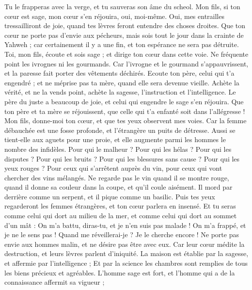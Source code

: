 \begin{multicols}{2}
Tu le frapperas avec la verge, et tu sauveras son âme du scheol.
Mon fils, si ton cœur est sage, mon cœur s'en réjouira, oui, moi-même.
Oui, mes entrailles tressailliront de joie, quand tes lèvres feront entendre des choses droites.
Que ton cœur ne porte pas d'envie aux pécheurs, mais sois tout le jour dans la crainte de Yahweh ;
car certainement il y a une fin, et ton espérance ne sera pas détruite.
Toi, mon fils, écoute et sois sage ; et dirige ton cœur dans cette voie.
Ne fréquente point les ivrognes ni les gourmands.
Car l'ivrogne et le gourmand s'appauvrissent, et la paresse fait porter des vêtements déchirés.
Ecoute ton père, celui qui t'a engendré ; et ne méprise pas ta mère, quand elle sera devenue vieille.
Achète la vérité, et ne la vends point, achète la sagesse, l'instruction et l'intelligence.
Le père du juste a beaucoup de joie, et celui qui engendre le sage s'en réjouira.
Que ton père et ta mère se réjouissent, que celle qui t'a enfanté soit dans l'allégresse !
Mon fils, donne-moi ton cœur, et que tes yeux observent mes voies.
Car la femme débauchée est une fosse profonde, et l'étrangère un puits de détresse.
Aussi se tient-elle aux aguets pour une proie, et elle augmente parmi les hommes le nombre des infidèles.
Pour qui le malheur ? Pour qui les hélas ? Pour qui les disputes ? Pour qui les bruits ? Pour qui les blessures sans cause ? Pour qui les yeux rouges ?
Pour ceux qui s'arrêtent auprès du vin, pour ceux qui vont chercher des vins mélangés.
Ne regarde pas le vin quand il se montre rouge, quand il donne sa couleur dans la coupe, et qu'il coule aisément.
Il mord par derrière comme un serpent, et il pique comme un basilic.
Puis tes yeux regarderont les femmes étrangères, et ton cœur parlera en insensé.
Et tu seras comme celui qui dort au milieu de la mer, et comme celui qui dort au sommet d'un mât :
On m'a battu, diras-tu, et je n'en suis pas malade ! On m'a frappé, et je ne le sens pas ! Quand me réveillerai-je ? Je le cherche encore !
\VerseOne{}Ne porte pas envie aux hommes malin, et ne désire pas être avec eux.
Car leur cœur médite la destruction, et leurs lèvres parlent d'iniquité.
La maison est établie par la sagesse, et affermie par l'intelligence ;
Et par la science les chambres sont remplies de tous les biens précieux et agréables.
L'homme sage est fort, et l'homme qui a de la connaissance affermit sa vigueur ;

\end{multicols}
